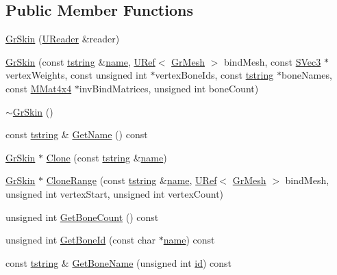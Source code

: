 \subsection*{Public Member Functions}
\begin{CompactItemize}
\item 
\hyperlink{class_gr_skin_a262f1da9afc382b7ce617ed6aaea61d}{GrSkin} (\hyperlink{class_u_reader}{UReader} \&reader)
\item 
\hyperlink{class_gr_skin_587b2544a711c849a438fda54e6f7b54}{GrSkin} (const \hyperlink{common__afx_8h_816fa58fd77499b0edb2c69ebe803d5c}{tstring} \&\hyperlink{glext__bak_8h_bb62efe59ccdd153ce42e1a418352209}{name}, \hyperlink{class_u_ref}{URef}$<$ \hyperlink{class_gr_mesh}{GrMesh} $>$ bindMesh, const \hyperlink{struct_s_vec3}{SVec3} $\ast$vertexWeights, const unsigned int $\ast$vertexBoneIds, const \hyperlink{common__afx_8h_816fa58fd77499b0edb2c69ebe803d5c}{tstring} $\ast$boneNames, const \hyperlink{class_m_mat4x4}{MMat4x4} $\ast$invBindMatrices, unsigned int boneCount)
\item 
\hyperlink{class_gr_skin_749fafea18281ab2f4d81bd3ce5a2771}{$\sim$GrSkin} ()
\item 
const \hyperlink{common__afx_8h_816fa58fd77499b0edb2c69ebe803d5c}{tstring} \& \hyperlink{class_gr_skin_ec9baeb9cbd26de5ab8747c8c81a7ff6}{GetName} () const 
\item 
\hyperlink{class_gr_skin}{GrSkin} $\ast$ \hyperlink{class_gr_skin_e800b5edb89326aa2a88dca02719d2a0}{Clone} (const \hyperlink{common__afx_8h_816fa58fd77499b0edb2c69ebe803d5c}{tstring} \&\hyperlink{glext__bak_8h_bb62efe59ccdd153ce42e1a418352209}{name})
\item 
\hyperlink{class_gr_skin}{GrSkin} $\ast$ \hyperlink{class_gr_skin_871be992c64f440b7281cc5792221477}{CloneRange} (const \hyperlink{common__afx_8h_816fa58fd77499b0edb2c69ebe803d5c}{tstring} \&\hyperlink{glext__bak_8h_bb62efe59ccdd153ce42e1a418352209}{name}, \hyperlink{class_u_ref}{URef}$<$ \hyperlink{class_gr_mesh}{GrMesh} $>$ bindMesh, unsigned int vertexStart, unsigned int vertexCount)
\item 
unsigned int \hyperlink{class_gr_skin_d30c05bc779eff721c1b9b269e3d28b8}{GetBoneCount} () const 
\item 
unsigned int \hyperlink{class_gr_skin_f383388a947be2484c6d5417b8f41475}{GetBoneId} (const char $\ast$\hyperlink{glext__bak_8h_bb62efe59ccdd153ce42e1a418352209}{name}) const 
\item 
const \hyperlink{common__afx_8h_816fa58fd77499b0edb2c69ebe803d5c}{tstring} \& \hyperlink{class_gr_skin_b5ddb23b555eb380c4e40ad57fd89ee8}{GetBoneName} (unsigned int \hyperlink{glext__bak_8h_58c2a664503e14ffb8f21012aabff3e9}{id}) const 

\end{CompactItemize}
